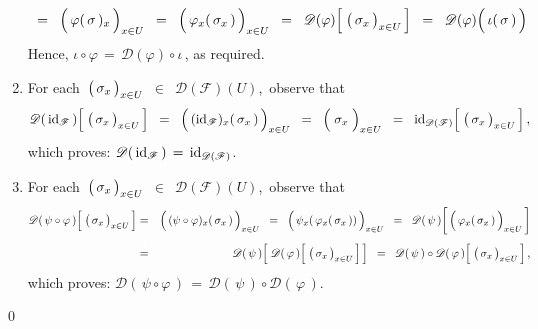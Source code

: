 \begin{enumerate}
\begin{equation*}
	\;\; = \;\;
		\left(\,\overset{{\color{white}.}}{\varphi(\,\sigma\,)_{x}}\,\right)_{x \in U}
	\;\; = \;\;
		\left(\,\overset{{\color{white}.}}{\varphi_{x}(\,\sigma_{x}\,)}\,\right)_{x \in U}
	\;\; = \;\;
		\mathscr{D}(\varphi)\!\left[\;\left(\,\overset{{\color{white}.}}{\sigma_{x}}\,\right)_{x \in U}\,\right]
	\;\; = \;\;
		\mathscr{D}(\varphi)\!\left(\,\overset{{\color{white}.}}{\iota(\,\sigma\,)}\,\right)
	\end{equation*}
	Hence, \;$\iota \circ \varphi \,=\, \mathscr{D}(\varphi) \circ \iota$\,,\; as required.
\item
	For each
	\,$\left(\,\overset{{\color{white}.}}{\sigma_{x}}\,\right)_{x \in U}$
	\,$\in$\, $\mathscr{D}(\mathscr{F})(U)$,\,
	observe that
	\begin{equation*}
	\mathscr{D}(\,\id_{\mathscr{F}}\,)\!\left[\;\left(\,\overset{{\color{white}.}}{\sigma_{x}}\,\right)_{x \in U}\,\right]
	\;\; = \;\;
		\left(\,\overset{{\color{white}.}}{(\id_{\mathscr{F}})_{x}(\,\sigma_{x}\,)}\,\right)_{x \in U}
	\;\; = \;\;
		\left(\;\overset{{\color{white}-}}{\sigma_{x}}\;\right)_{x \in U}
	\;\; = \;\;
		\id_{\mathscr{D}(\mathscr{F})}\!\left[\;\left(\,\overset{{\color{white}.}}{\sigma_{x}}\,\right)_{x \in U}\,\right],
	\end{equation*}
	which proves: \;$\mathscr{D}(\,\textnormal{id}_{\mathscr{F}}\,) \,=\, \textnormal{id}_{\mathscr{D}(\mathscr{F})}$.
\item
	For each
	\,$\left(\,\overset{{\color{white}.}}{\sigma_{x}}\,\right)_{x \in U}$
	\,$\in$\, $\mathscr{D}(\mathscr{F})(U)$,\,
	observe that
	\begin{eqnarray*}
	\mathscr{D}(\,\psi\circ\varphi\,)\!\left[\;\left(\,\overset{{\color{white}.}}{\sigma_{x}}\,\right)_{x \in U}\,\right]
	& = &
		\left(\,\overset{{\color{white}.}}{(\psi\circ\varphi)_{x}(\,\sigma_{x}\,)}\,\right)_{x \in U}
	\;\; = \;\;
		\left(\,\overset{{\color{white}.}}{\psi_{x}(\,\varphi_{x}(\,\sigma_{x}\,))}\,\right)_{x \in U}
	\;\; = \;\;
		\mathscr{D}(\,\psi\,)\!\left[\,\left(\,\overset{{\color{white}.}}{\varphi_{x}(\,\sigma_{x}\,)}\,\right)_{x \in U}\,\right]
	\\
	& \overset{{\color{white}\textnormal{\Large$1$}}}{=} &
		\mathscr{D}(\,\psi\,)\!\left[\;
			\mathscr{D}(\,\varphi\,)\!\left[\;\left(\,\overset{{\color{white}.}}{\sigma_{x}}\,\right)_{x \in U}\,\right]
			\,\right]
	\;\; = \;\;
		\mathscr{D}(\,\psi\,)\circ\mathscr{D}(\,\varphi\,)
			\!\left[\;\left(\,\overset{{\color{white}.}}{\sigma_{x}}\,\right)_{x \in U}\,\right],
	\end{eqnarray*}
	which proves: \;$\mathscr{D}(\,\psi\circ\varphi\,) \,=\, \mathscr{D}(\,\psi\,)\circ\mathscr{D}(\,\varphi\,)$.
\end{enumerate}
\qed

